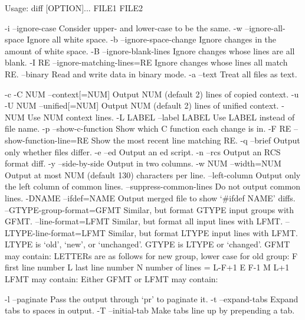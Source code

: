 \begin{textcode}
Usage: diff [OPTION]... FILE1 FILE2

  -i  --ignore-case  Consider upper- and lower-case to be the same.
  -w  --ignore-all-space  Ignore all white space.
  -b  --ignore-space-change  Ignore changes in the amount of white space.
  -B  --ignore-blank-lines  Ignore changes whose lines are all blank.
  -I RE  --ignore-matching-lines=RE  Ignore changes whose lines all match RE.
  --binary  Read and write data in binary mode.
  -a  --text  Treat all files as text.

  -c  -C NUM  --context[=NUM]  Output NUM (default 2) lines of copied context.
  -u  -U NUM  --unified[=NUM]  Output NUM (default 2) lines of unified context.
    -NUM  Use NUM context lines.
    -L LABEL  --label LABEL  Use LABEL instead of file name.
    -p  --show-c-function  Show which C function each change is in.
    -F RE  --show-function-line=RE  Show the most recent line matching RE.
  -q  --brief  Output only whether files differ.
  -e  --ed  Output an ed script.
  -n  --rcs  Output an RCS format diff.
  -y  --side-by-side  Output in two columns.
    -w NUM  --width=NUM  Output at most NUM (default 130) characters per line.
    --left-column  Output only the left column of common lines.
    --suppress-common-lines  Do not output common lines.
  -DNAME  --ifdef=NAME  Output merged file to show `#ifdef NAME' diffs.
  --GTYPE-group-format=GFMT  Similar, but format GTYPE input groups with GFMT.
  --line-format=LFMT  Similar, but format all input lines with LFMT.
  --LTYPE-line-format=LFMT  Similar, but format LTYPE input lines with LFMT.
    LTYPE is `old', `new', or `unchanged'.  GTYPE is LTYPE or `changed'.
    GFMT may contain:
        LETTERs are as follows for new group, lower case for old group:
          F  first line number
          L  last line number
          N  number of lines = L-F+1
          E  F-1
          M  L+1
    LFMT may contain:
    Either GFMT or LFMT may contain:

  -l  --paginate  Pass the output through `pr' to paginate it.
  -t  --expand-tabs  Expand tabs to spaces in output.
  -T  --initial-tab  Make tabs line up by prepending a tab.


\end{textcode}
